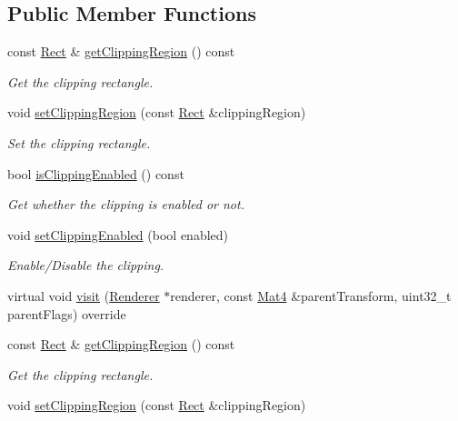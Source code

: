 \subsection*{Public Member Functions}
\begin{DoxyCompactItemize}
\item 
const \hyperlink{classRect}{Rect} \& \hyperlink{classClippingRectangleNode_a344c7fa4f997d75ea410c6f6da3ecc40}{get\+Clipping\+Region} () const
\begin{DoxyCompactList}\small\item\em Get the clipping rectangle. \end{DoxyCompactList}\item 
void \hyperlink{classClippingRectangleNode_a82398119a6db93a95eec2e8275119f2d}{set\+Clipping\+Region} (const \hyperlink{classRect}{Rect} \&clipping\+Region)
\begin{DoxyCompactList}\small\item\em Set the clipping rectangle. \end{DoxyCompactList}\item 
bool \hyperlink{classClippingRectangleNode_a8ebbf22123f002ba75266e25e050a031}{is\+Clipping\+Enabled} () const
\begin{DoxyCompactList}\small\item\em Get whether the clipping is enabled or not. \end{DoxyCompactList}\item 
void \hyperlink{classClippingRectangleNode_a3748322e0d2a5e082eaf2c56d74c6229}{set\+Clipping\+Enabled} (bool enabled)
\begin{DoxyCompactList}\small\item\em Enable/\+Disable the clipping. \end{DoxyCompactList}\item 
virtual void \hyperlink{classClippingRectangleNode_ae875ea898f086aa7106b803ddbcbf47f}{visit} (\hyperlink{classRenderer}{Renderer} $\ast$renderer, const \hyperlink{classMat4}{Mat4} \&parent\+Transform, uint32\+\_\+t parent\+Flags) override
\item 
const \hyperlink{classRect}{Rect} \& \hyperlink{classClippingRectangleNode_a344c7fa4f997d75ea410c6f6da3ecc40}{get\+Clipping\+Region} () const
\begin{DoxyCompactList}\small\item\em Get the clipping rectangle. \end{DoxyCompactList}\item 
void \hyperlink{classClippingRectangleNode_a82398119a6db93a95eec2e8275119f2d}{set\+Clipping\+Region} (const \hyperlink{classRect}{Rect} \&clipping\+Region)

\end{DoxyCompactItemize}
